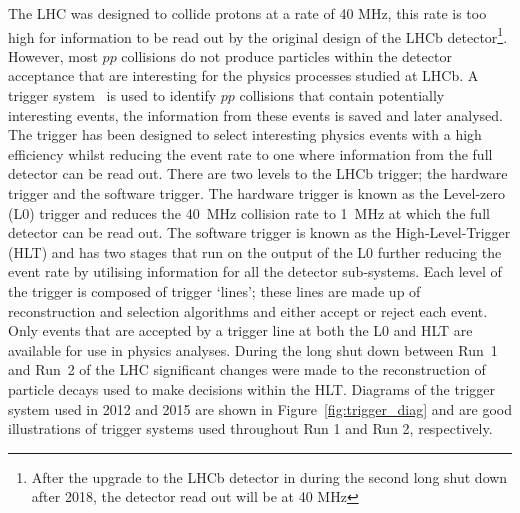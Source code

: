 The LHC was designed to collide protons at a rate of 40 MHz, this rate is too high for information to be read out by the original design of the LHCb detector\footnote{After the upgrade to the LHCb detector in during the second long shut down after 2018, the detector read out will be at 40 MHz}. However, most $pp$ collisions do not produce particles within the detector acceptance that are interesting for the physics processes studied at LHCb. A trigger system~\cite{Alves:2008zz,Aaij:2012me,Albrecht:2013fba} is used to identify $pp$ collisions that contain potentially interesting events, the information from these events is saved and later analysed. The trigger has been designed to select interesting physics events with a high efficiency whilst reducing the event rate to one where information from the full detector can be read out.  There are two levels to the LHCb trigger; the hardware trigger and the software trigger. The hardware trigger is known as the Level-zero (L0) trigger and reduces the 40~MHz collision rate to 1~MHz at which the full detector can be read out. The software trigger is known as the High-Level-Trigger (HLT) and has two stages that run on the output of the L0 further reducing the event rate by utilising information for all the detector sub-systems. Each level of the trigger is composed of trigger `lines'; these lines are made up of reconstruction and selection algorithms and either accept or reject each event. Only events that are accepted by a trigger line at both the L0 and HLT are available for use in physics analyses. 
During the long shut down between Run~1 and Run~2 of the LHC significant changes were made to the reconstruction of particle decays used to make decisions within the HLT. Diagrams of the trigger system used in 2012 and 2015 are shown in Figure~\ref{fig:trigger_diag} and are good illustrations of trigger systems used throughout Run 1 and Run 2, respectively.


